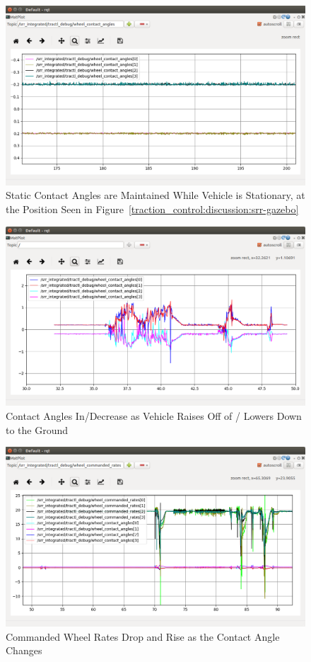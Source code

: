 \begin{figure}[H]
	\centering
	\includegraphics[width=\textwidth]{sections/discussion/images/static_contact_angles.png}
	\caption{Static Contact Angles are Maintained While Vehicle is Stationary, at the Position Seen in Figure~\ref{traction_control:discussion:srr-gazebo}}
	\label{traction_control:discussion:static-contact-angles}
\end{figure}

\begin{figure}[H]
	\centering
	\includegraphics[width=\textwidth]{sections/discussion/images/rising_falling_contact_angles.png}
	\caption{Contact Angles In/Decrease as Vehicle Raises Off of / Lowers Down to the Ground}
	\label{traction_control:discussion:rising-falling-contact-angles}
\end{figure}

\begin{figure}[H]
	\centering
	\includegraphics[width=\textwidth]{sections/discussion/images/wheel_commanded_rates.png}
	\caption{Commanded Wheel Rates Drop and Rise as the Contact Angle Changes}
	\label{traction_control:discussion:moving-wheel-commanded-rates}
\end{figure}
